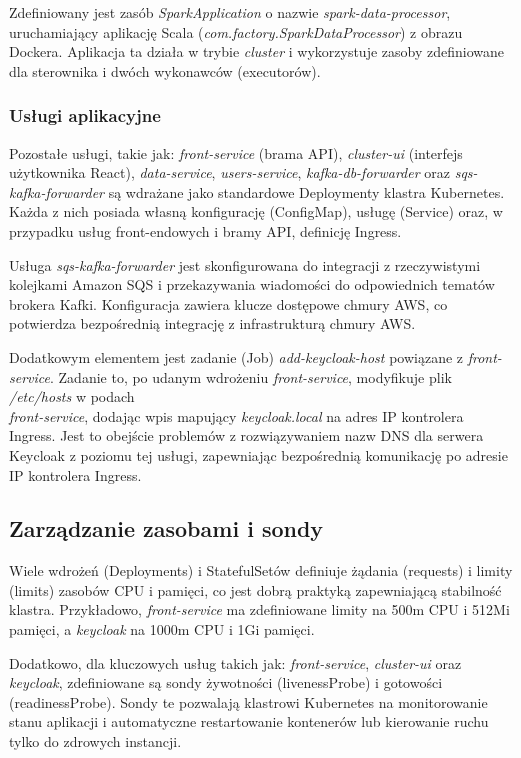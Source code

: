 Zdefiniowany jest zasób \textit{SparkApplication} o nazwie \textit{spark-data-processor}, uruchamiający aplikację Scala (\textit{com.factory.SparkDataProcessor}) z obrazu Dockera. Aplikacja ta działa w trybie \textit{cluster} i wykorzystuje zasoby zdefiniowane dla sterownika i dwóch wykonawców (executorów).

\subsubsection{Usługi aplikacyjne}
Pozostałe usługi, takie jak: \textit{front-service} (brama API), \textit{cluster-ui} (interfejs użytkownika React), \textit{data-service}, \textit{users-service}, \textit{kafka-db-forwarder} oraz \textit{sqs-kafka-forwarder} są wdrażane jako standardowe Deploymenty klastra Kubernetes. Każda z nich posiada własną konfigurację (ConfigMap), usługę (Service) oraz, w przypadku usług front-endowych i bramy API, definicję Ingress.

Usługa \textit{sqs-kafka-forwarder} jest skonfigurowana do integracji z rzeczywistymi kolejkami Amazon SQS i przekazywania wiadomości do odpowiednich tematów brokera Kafki. Konfiguracja zawiera klucze dostępowe chmury AWS, co potwierdza bezpośrednią integrację z infrastrukturą chmury AWS.

Dodatkowym elementem jest zadanie (Job) \textit{add-keycloak-host} powiązane z \textit{front-service}. Zadanie to, po udanym wdrożeniu \textit{front-service}, modyfikuje plik \textit{/etc/hosts} w podach \\ \textit{front-service}, dodając wpis mapujący \textit{keycloak.local} na adres IP kontrolera Ingress. Jest to obejście problemów z rozwiązywaniem nazw DNS dla serwera Keycloak z poziomu tej usługi, zapewniając bezpośrednią komunikację po adresie IP kontrolera Ingress.

\subsection{Zarządzanie zasobami i sondy}
\label{sub:zasoby_sondy}
Wiele wdrożeń (Deployments) i StatefulSetów definiuje żądania (requests) i limity (limits) zasobów CPU i pamięci, co jest dobrą praktyką zapewniającą stabilność klastra. Przykładowo, \textit{front-service} ma zdefiniowane limity na 500m CPU i 512Mi pamięci, a \textit{keycloak} na 1000m CPU i 1Gi pamięci.

Dodatkowo, dla kluczowych usług takich jak: \textit{front-service}, \textit{cluster-ui} oraz \textit{keycloak}, zdefiniowane są sondy żywotności (livenessProbe) i gotowości (readinessProbe). Sondy te pozwalają klastrowi Kubernetes na monitorowanie stanu aplikacji i automatyczne restartowanie kontenerów lub kierowanie ruchu tylko do zdrowych instancji.
